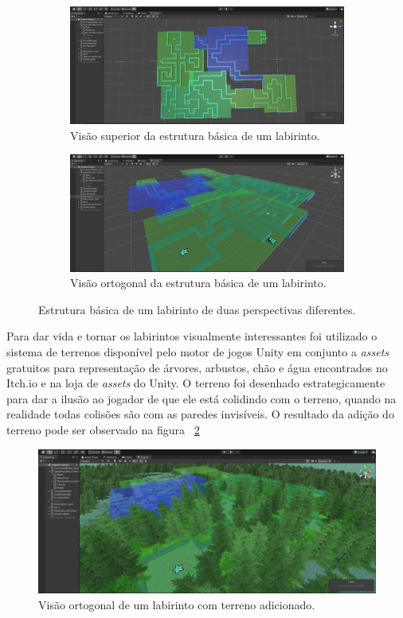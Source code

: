 \begin{figure}[h!]
  \centering
  \begin{subfigure}[b]{0.75\linewidth}
    \includegraphics[width=\linewidth]{basicLab.png}
     \caption{Visão superior da estrutura básica de um labirinto.}
  \end{subfigure}
  \begin{subfigure}[b]{0.75\linewidth}
    \includegraphics[width=\linewidth]{basicLab2.png}
    \caption{Visão ortogonal da estrutura básica de um labirinto.}
  \end{subfigure}
  \caption{Estrutura básica de um labirinto de duas perspectivas diferentes.}
  \label{fig:basicLab}
\end{figure}

Para dar vida e tornar os labirintos visualmente interessantes foi utilizado o sistema de terrenos disponível pelo motor de jogos Unity em conjunto a \emph{assets} gratuitos para representação de árvores, arbustos, chão e água encontrados no Itch.io e na loja de \emph{assets} do Unity. O terreno foi desenhado estrategicamente para dar a ilusão ao jogador de que ele está colidindo com o terreno, quando na realidade todas colisões são com as paredes invisíveis. O resultado da adição do terreno pode ser observado na figura ~\ref{fig:terrain}

\begin{figure}[h!]
 \centering
  \includegraphics[width=0.75\linewidth]{prettyLab.png}
  \caption{Visão ortogonal de um labirinto com terreno adicionado.}
  \label{fig:terrain}
\end{figure}

